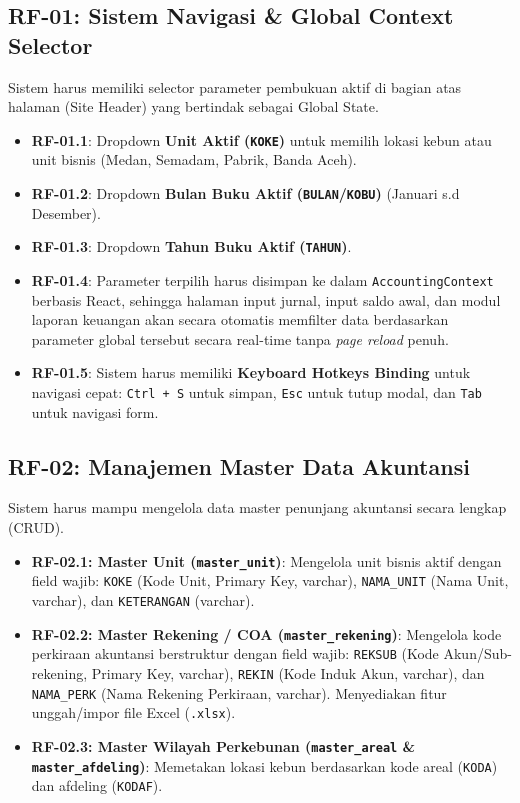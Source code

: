 \documentclass[11pt,a4paper]{article}
\begin{document}
\subsection{RF-01: Sistem Navigasi \& Global Context Selector}
Sistem harus memiliki selector parameter pembukuan aktif di bagian atas halaman (Site Header) yang bertindak sebagai Global State.
\begin{itemize}
    \item \textbf{RF-01.1}: Dropdown \textbf{Unit Aktif (\texttt{KOKE})} untuk memilih lokasi kebun atau unit bisnis (Medan, Semadam, Pabrik, Banda Aceh).
    \item \textbf{RF-01.2}: Dropdown \textbf{Bulan Buku Aktif (\texttt{BULAN}/\texttt{KOBU})} (Januari s.d Desember).
    \item \textbf{RF-01.3}: Dropdown \textbf{Tahun Buku Aktif (\texttt{TAHUN})}.
    \item \textbf{RF-01.4}: Parameter terpilih harus disimpan ke dalam \texttt{AccountingContext} berbasis React, sehingga halaman input jurnal, input saldo awal, dan modul laporan keuangan akan secara otomatis memfilter data berdasarkan parameter global tersebut secara real-time tanpa \textit{page reload} penuh.
    \item \textbf{RF-01.5}: Sistem harus memiliki \textbf{Keyboard Hotkeys Binding} untuk navigasi cepat: \texttt{Ctrl + S} untuk simpan, \texttt{Esc} untuk tutup modal, dan \texttt{Tab} untuk navigasi form.
\end{itemize}

\subsection{RF-02: Manajemen Master Data Akuntansi}
Sistem harus mampu mengelola data master penunjang akuntansi secara lengkap (CRUD).
\begin{itemize}
    \item \textbf{RF-02.1: Master Unit (\texttt{master\_unit})}: Mengelola unit bisnis aktif dengan field wajib: \texttt{KOKE} (Kode Unit, Primary Key, varchar), \texttt{NAMA\_UNIT} (Nama Unit, varchar), dan \texttt{KETERANGAN} (varchar).
    \item \textbf{RF-02.2: Master Rekening / COA (\texttt{master\_rekening})}: Mengelola kode perkiraan akuntansi berstruktur dengan field wajib: \texttt{REKSUB} (Kode Akun/Sub-rekening, Primary Key, varchar), \texttt{REKIN} (Kode Induk Akun, varchar), dan \texttt{NAMA\_PERK} (Nama Rekening Perkiraan, varchar). Menyediakan fitur unggah/impor file Excel (\texttt{.xlsx}).
    \item \textbf{RF-02.3: Master Wilayah Perkebunan (\texttt{master\_areal} \& \texttt{master\_afdeling})}: Memetakan lokasi kebun berdasarkan kode areal (\texttt{KODA}) dan afdeling (\texttt{KODAF}).
\end{itemize}
\end{document}
